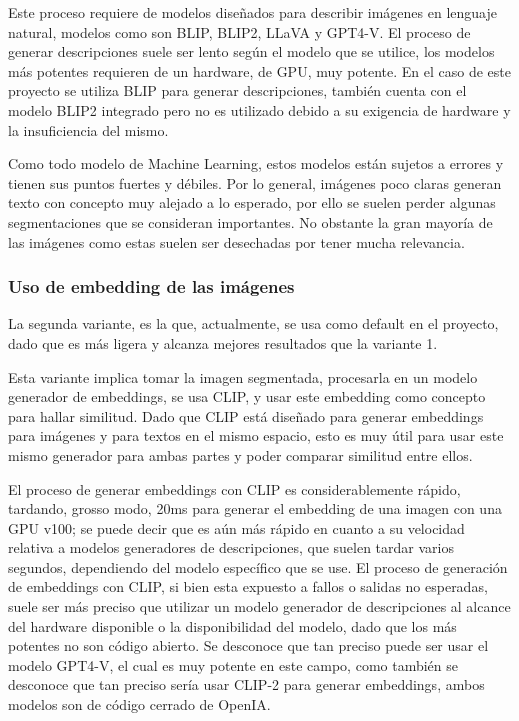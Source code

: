Este proceso requiere de modelos diseñados para describir imágenes en lenguaje natural, modelos como son BLIP, BLIP2, LLaVA y GPT4-V. El proceso de generar descripciones suele ser lento según el modelo que se utilice, los modelos más potentes requieren de un hardware, de GPU, muy potente. En el caso de este proyecto se utiliza BLIP para generar descripciones, también cuenta con el modelo BLIP2 integrado pero no es utilizado debido a su exigencia de hardware y la insuficiencia del mismo.

Como todo modelo de Machine Learning, estos modelos están sujetos a errores y tienen sus puntos fuertes y débiles. Por lo general, imágenes poco claras generan texto con concepto muy alejado a lo esperado, por ello se suelen perder algunas segmentaciones que se consideran importantes. No obstante la gran mayoría de las imágenes como estas suelen ser desechadas por tener mucha relevancia.

\subsubsection*{Uso de embedding de las imágenes}
La segunda variante, es la que, actualmente, se usa como default en el proyecto, dado que es más ligera y alcanza mejores resultados que la variante 1.

Esta variante implica tomar la imagen segmentada, procesarla en un modelo generador de embeddings, se usa CLIP, y usar este embedding como concepto para hallar similitud. Dado que CLIP está diseñado para generar embeddings para imágenes y para textos en el mismo espacio, esto es muy útil para usar este mismo generador para ambas partes y poder comparar similitud entre ellos.

El proceso de generar embeddings con CLIP es considerablemente rápido, tardando, grosso modo, 20ms para generar el embedding de una imagen con una GPU v100; se puede decir que es aún más rápido en cuanto a su velocidad relativa a modelos generadores de descripciones, que suelen tardar varios segundos, dependiendo del modelo específico que se use. El proceso de generación de embeddings con CLIP, si bien esta expuesto a fallos o salidas no esperadas, suele ser más preciso que utilizar un modelo generador de descripciones al alcance del hardware disponible o la disponibilidad del modelo, dado que los más potentes no son código abierto. Se desconoce que tan preciso puede ser usar el modelo GPT4-V, el cual es muy potente en este campo, como también se desconoce que tan preciso sería usar CLIP-2 para generar embeddings, ambos modelos son de código cerrado de OpenIA.

